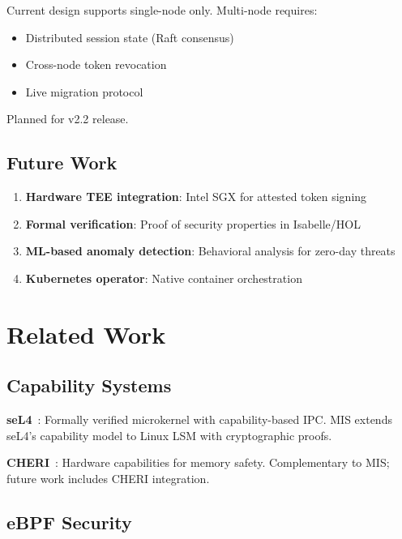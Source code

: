 \documentclass[11pt,a4paper]{article}
\begin{document}
Current design supports single-node only. Multi-node requires:
\begin{itemize}
    \item Distributed session state (Raft consensus)
    \item Cross-node token revocation
    \item Live migration protocol
\end{itemize}

Planned for v2.2 release.

\subsection{Future Work}

\begin{enumerate}
    \item \textbf{Hardware TEE integration}: Intel SGX for attested token signing
    \item \textbf{Formal verification}: Proof of security properties in Isabelle/HOL
    \item \textbf{ML-based anomaly detection}: Behavioral analysis for zero-day threats
    \item \textbf{Kubernetes operator}: Native container orchestration
\end{enumerate}

\section{Related Work}

\subsection{Capability Systems}

\textbf{seL4}~\cite{Klein2009}: Formally verified microkernel with capability-based IPC. MIS extends seL4's capability model to Linux LSM with cryptographic proofs.

\textbf{CHERI}~\cite{Watson2015}: Hardware capabilities for memory safety. Complementary to MIS; future work includes CHERI integration.

\subsection{eBPF Security}
\end{document}
